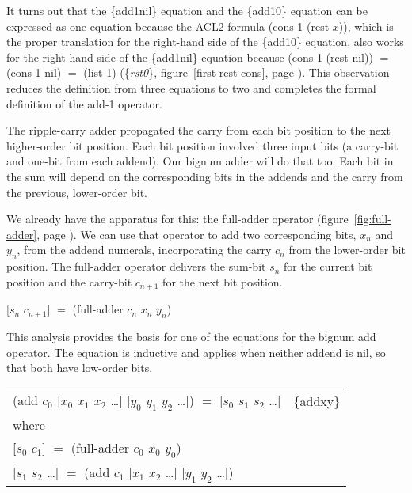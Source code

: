 It turns out that the \{add1nil\} equation
and the \{add10\} equation can be expressed as one equation because
the ACL2 formula \textsf{(cons 1 (rest $x$))}, which is the proper
translation for the right-hand side of the \{add10\} equation,
also works for the right-hand side of the \{add1nil\} equation
because \textsf{(cons 1 (rest nil))} $=$ \textsf{(cons 1 nil)} $=$ \textsf{(list 1)}
(\{\emph{rst0}\}, figure~\ref{first-rest-cons}, page \pageref{first-rest-cons}).
This observation reduces the definition from three equations to two
and completes the formal definition of the \textsf{add-1} operator.

The ripple-carry adder propagated the carry from each bit position
to the next higher-order bit position.
Each bit position involved three input bits
(a carry-bit and one-bit from each addend).
Our bignum adder will do that too.
Each bit in the sum will depend on the
corresponding bits in the addends and the carry from
the previous, lower-order bit.

We already have the apparatus for this: the \textsf{full-adder} operator
(figure~\ref{fig:full-adder},  page \pageref{fig:full-adder}).
We can use that operator to add two corresponding bits,
$x_n$ and $y_n$, from the addend numerals,
incorporating the carry $c_n$ from the lower-order bit position.
The \textsf{full-adder} operator delivers the sum-bit $s_n$ for the current
bit position and the carry-bit $c_{n+1}$ for the next bit position.
\begin{center}
\textsf{[$s_n$ $c_{n+1}$]} $=$ \textsf{(full-adder $c_n$ $x_n$ $y_n$)}
\end{center}

This analysis provides the basis for
one of the equations for the bignum \textsf{add} operator.
The equation is inductive and applies
when neither addend is \textsf{nil},
so that both have low-order bits.

\begin{center}
\begin{tabular}{ll}
\textsf{(add $c_0$ [$x_0$ $x_1$ $x_2$ \dots ] [$y_0$ $y_1$ $y_2$ \dots ])} $=$ \textsf{[$s_0$ $s_1$ $s_2$ \dots ]}   & \{addxy\} \\
where & \\
\textsf{[$s_0$ $c_1$]} $=$ \textsf{(full-adder $c_0$ $x_0$ $y_0$)} & \\
\textsf{[$s_1$ $s_2$ \dots ]} $=$ \textsf{(add $c_1$ [$x_1$ $x_2$ \dots ] [$y_1$ $y_2$ \dots ])} & \\
\end{tabular}
\end{center}

